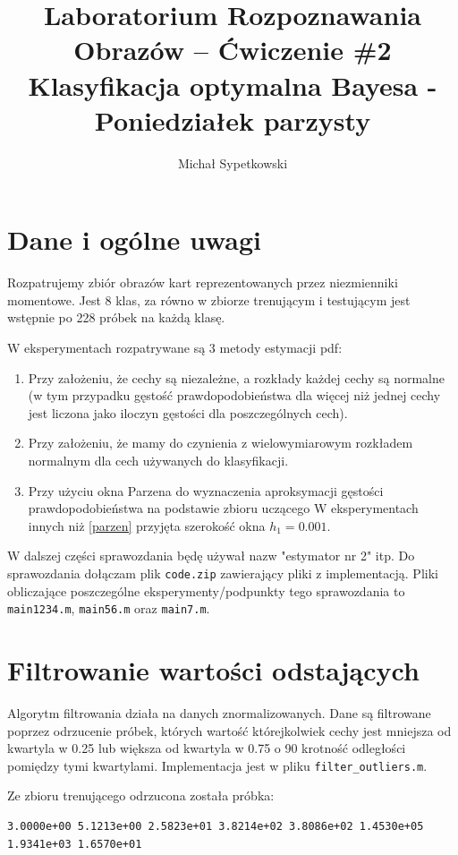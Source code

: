 \documentclass[a4paper]{article}
\begin{document}
\title{Laboratorium Rozpoznawania Obrazów – Ćwiczenie \#2 Klasyfikacja optymalna Bayesa - Poniedziałek parzysty}

\author{Michał Sypetkowski}
\maketitle


\section{Dane i ogólne uwagi}
Rozpatrujemy zbiór obrazów kart reprezentowanych przez niezmienniki momentowe.
Jest 8 klas, za równo w zbiorze trenującym i testującym jest wstępnie po 228 próbek na każdą klasę.

W eksperymentach rozpatrywane są 3 metody estymacji pdf:
\begin{enumerate}
\item Przy założeniu, że cechy są niezależne, a rozkłady każdej cechy są normalne (w tym
    przypadku gęstość prawdopodobieństwa dla więcej niż jednej cechy jest liczona jako
    iloczyn gęstości dla poszczególnych cech).
\item Przy założeniu, że mamy do czynienia z wielowymiarowym rozkładem normalnym dla cech
    używanych do klasyfikacji.
\item Przy użyciu okna Parzena do wyznaczenia aproksymacji gęstości prawdopodobieństwa na
    podstawie zbioru uczącego
    W eksperymentach innych niż \ref{parzen} przyjęta szerokość okna $h_1=0.001$.
\end{enumerate}
W dalszej części sprawozdania będę używał nazw "estymator nr 2" itp.
Do sprawozdania dołączam plik \texttt{code.zip} zawierający pliki z implementacją.
Pliki obliczające poszczególne eksperymenty/podpunkty tego sprawozdania to
\texttt{main1234.m}, \texttt{main56.m} oraz \texttt{main7.m}.


\section{Filtrowanie wartości odstających}
Algorytm filtrowania działa na danych znormalizowanych.
Dane są filtrowane poprzez odrzucenie próbek,
których wartość którejkolwiek cechy jest mniejsza
od kwartyla w 0.25 lub większa od kwartyla w 0.75 o 90 krotność odległości pomiędzy tymi kwartylami.
Implementacja jest w pliku \texttt{filter\_outliers.m}.

Ze zbioru trenującego odrzucona została próbka:
\begin{verbatim}
3.0000e+00 5.1213e+00 2.5823e+01 3.8214e+02 3.8086e+02 1.4530e+05 1.9341e+03 1.6570e+01
\end{verbatim}
\end{document}
